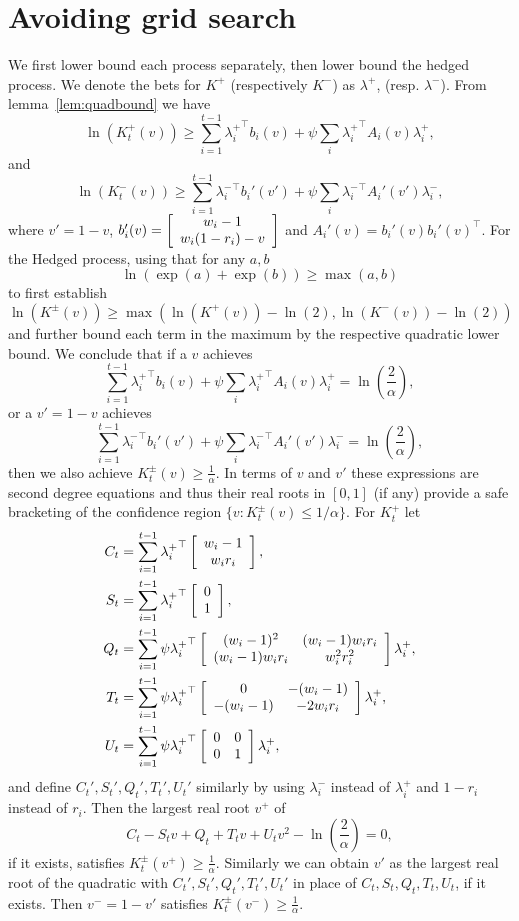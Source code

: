 \section{Avoiding grid search}
\label{app:nogrid2d}
We first lower bound each process separately, then lower bound
the hedged process. We denote the bets for $K^{+}$ (respectively
$K^{-}$) as $\lambda^{+}$, (resp. $\lambda^{-}$).
From lemma~\ref{lem:quadbound} we have
\[
\ln(K_t^{+}(v)) \geq \sum_{i=1}^{t-1} {\lambda_i^{+}}^\top b_i(v) + \psi \sum_i {\lambda_i^{+}}^\top A_i(v) {\lambda_i^{+}},
\]
and
\[
\ln(K_t^{-}(v)) \geq \sum_{i=1}^{t-1} {\lambda_i^{-}}^\top b_i'(v') + \psi \sum_i {\lambda_i^{-}}^\top A_i'(v') {\lambda_i^{-}},
\]
where $v'=1-v$, 
$b_i'(v)=
\left[\begin{array}{c} w_i-1 \\ w_i (1-r_i) -v \end{array}\right]
$
and $A_i'(v)=b_i'(v)b_i'(v)^\top$.
For the Hedged process, using that for any $a,b$
\[
\ln\left(\exp(a)+\exp(b)\right)\geq \max(a,b)
\]
to first establish
\[
\ln(K^{\pm}(v)) \geq \max(\ln(K^{+}(v))-\ln(2),\ln(K^{-}(v))-\ln(2))
\]
and further bound each term in the maximum by the respective 
quadratic lower bound. We conclude that
if a $v$ achieves 
\[
 \sum_{i=1}^{t-1} {\lambda_i^{+}}^\top b_i(v) + \psi \sum_i {\lambda_i^{+}}^\top A_i(v) \lambda_i^{+} = \ln\left(\frac{2}{\alpha}\right),
\]
or a $v'=1-v$ achieves 
\[
\sum_{i=1}^{t-1} {\lambda_i^{-}}^\top b_i'(v') + \psi \sum_i {\lambda_i^{-}}^\top A_i'(v') \lambda_i^{-} = \ln\left(\frac{2}{\alpha}\right),
\]
then we also achieve $K_t^{\pm}(v) \geq \frac{1}{\alpha}$.
In terms of $v$ and $v'$ these expressions are second degree
equations and thus their real roots in $[0,1]$ (if any) provide 
a safe bracketing of the confidence region $\{v:K_t^{\pm}(v)\leq 1/\alpha\}$. For $K_t^{+}$ let
\begin{align}
C_t&= \sum_{i=1}^{t-1} {\lambda_i^{+}}^\top \left[\begin{array}{c} w_i-1 \\ w_i r_i \end{array}\right] \label{eq:upsuffc} ,\\
S_t&= \sum_{i=1}^{t-1} {\lambda_i^{+}}^\top \left[\begin{array}{c} 0 \\ 1 \end{array}\right] ,\\
Q_t&= \sum_{i=1}^{t-1} \psi  {\lambda_i^{+}}^\top \left[\begin{array}{cc} (w_i-1)^2 & (w_i-1)w_i r_i \\ (w_i-1)w_i r_i & w_i^2r_i^2 \end{array}\right] \lambda_i^{+} ,\\
T_t&= \sum_{i=1}^{t-1} \psi  {\lambda_i^{+}}^\top \left[\begin{array}{cc} 0 & -(w_i-1) \\ -(w_i-1) & -2w_ir_i \end{array}\right] \lambda_i^{+} ,\\
U_t&=  \sum_{i=1}^{t-1} \psi {\lambda_i^{+}}^\top \left[\begin{array}{cc} 0 & 0 \\ 0 & 1 \end{array}\right] \lambda_i^{+}, \label{eq:upsuffu}
\end{align}
and define $C_t',S_t',Q_t',T_t',U_t'$ similarly by using $\lambda_i^{-}$ 
instead of $\lambda_i^{+}$ and $1-r_i$ instead of $r_i$. Then
the largest real root $v^{+}$ of
\[
C_t - S_t v + Q_t + T_t v + U_t v^2 - \ln\left(\frac{2}{\alpha}\right) = 0,
\]
if it exists, satisfies $K_t^{\pm}(v^{+})\geq \frac{1}{\alpha}$. Similarly
we can obtain $v'$ as the largest real root of the quadratic
with $C_t',S_t',Q_t',T_t',U_t'$ in place of $C_t,S_t,Q_t,T_t,U_t$,
if it exists. Then $v^{-}=1-v'$ satisfies $K_t^{\pm}(v^{-})\geq \frac{1}{\alpha}$.


